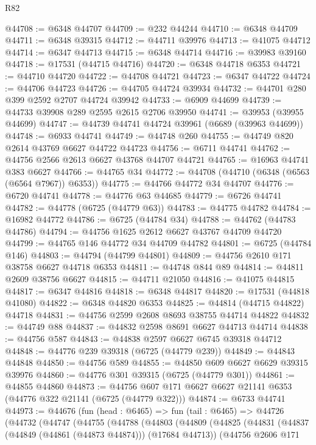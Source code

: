 \begin{lexlean}{R82}
\begin{coremodule}
@44708 := @6348 @44707
@44709 := @232 @44244
@44710 := @6348 @44709
@44711 := @6348 @39315
@44712 := @44711 @39976
@44713 := @41075 @44712
@44714 := @6347 @44713
@44715 := @6348 @44714
@44716 := @39983 @39160
@44718 := @17531 (@44715 @44716)
@44720 := @6348 @44718 @6353
@44721 := @44710 @44720
@44722 := @44708 @44721
@44723 := @6347 @44722
@44724 := @44706 @44723
@44726 := @44705 @44724 @39934
@44732 := @44701 @280 @399 @2592 @2707 @44724 @39942
@44733 := @6909 @44699
@44739 := @44733 @39908 @289 @2595 @2615 @2706 @39950
@44741 := @39953 (@39955 @44699)
@44747 := @44739 @44741 @44724 @39961 (@6689 (@39963 @44699))
@44748 := @6933 @44741
@44749 := @44748 @260
@44755 := @44749 @820 @2614 @43769 @6627 @44722 @44723
@44756 := @6711 @44741
@44762 := @44756 @2566 @2613 @6627 @43768 @44707 @44721
@44765 := @16963 @44741 @383 @6627
@44766 := @44765 @34
@44772 := @44708 (@44710 (@6348 (@6563 (@6564 @7967)) @6353))
@44775 := @44766 @44772 @34 @44707
@44776 := @6720 @44741
@44778 := @44776 @63 @44685
@44779 := @6726 @44741
@44782 := @44778 (@6725 (@44779 @63))
@44783 := @44775 @44782
@44784 := @16982 @44772
@44786 := @6725 (@44784 @34)
@44788 := @44762 (@44783 @44786)
@44794 := @44756 @1625 @2612 @6627 @43767 @44709 @44720
@44799 := @44765 @146 @44772 @34 @44709 @44782
@44801 := @6725 (@44784 @146)
@44803 := @44794 (@44799 @44801)
@44809 := @44756 @2610 @171 @38758 @6627 @44718 @6353
@44811 := @44748 @844 @89
@44814 := @44811 @2609 @38756 @6627
@44815 := @44711 @21050
@44816 := @41075 @44815
@44817 := @6347 @44816
@44818 := @6348 @44817
@44820 := @17531 (@44818 @41080)
@44822 := @6348 @44820 @6353
@44825 := @44814 (@44715 @44822) @44718
@44831 := @44756 @2599 @2608 @8693 @38755 @44714 @44822
@44832 := @44749 @88
@44837 := @44832 @2598 @8691 @6627 @44713 @44714
@44838 := @44756 @587
@44843 := @44838 @2597 @6627 @6745 @39318 @44712
@44848 := @44776 @239 @39318 (@6725 (@44779 @239))
@44849 := @44843 @44848
@44850 := @44756 @589
@44855 := @44850 @609 @6627 @6629 @39315 @39976
@44860 := @44776 @301 @39315 (@6725 (@44779 @301))
@44861 := @44855 @44860
@44873 := @44756 @607 @171 @6627 @6627 @21141 @6353 (@44776 @322 @21141 (@6725 (@44779 @322)))
@44874 := @6733 @44741
@44973 := @44676
    (fun (head : @6465) =>
    fun (tail : @6465) =>
    @44726
      (@44732
        (@44747
          (@44755
            (@44788
              (@44803
                (@44809
                  (@44825
                    (@44831
                      (@44837 (@44849 (@44861 (@44873 @44874))) (@17684 @44713))
                      (@44756
                        @2606
                        @171

\end{coremodule}
\end{lexlean}
